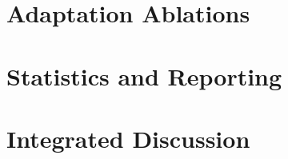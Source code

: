 \section{Adaptation Ablations}
\label{sec:eval:ablations}

\section{Statistics and Reporting}
\label{sec:eval:metrics}

\section{Integrated Discussion}
\label{sec:eval:discussion}

